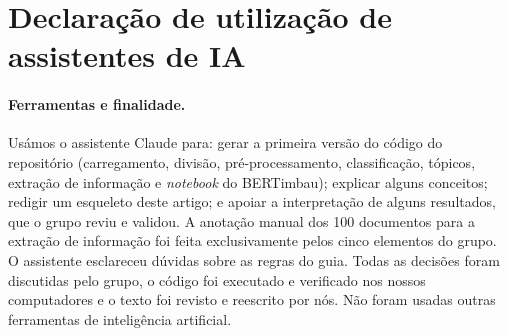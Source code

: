 \section{Declaração de utilização de assistentes de IA}\label{app:ia}

\paragraph{Ferramentas e finalidade.}
Usámos o assistente Claude para: gerar a primeira versão do código do repositório (carregamento,
divisão, pré-processamento, classificação, tópicos, extração de informação e \emph{notebook} do
BERTimbau); explicar alguns conceitos; redigir um esqueleto deste
artigo; e apoiar a interpretação de alguns resultados, que o grupo reviu e validou. A anotação manual dos 100
documentos para a extração de informação foi feita exclusivamente pelos cinco elementos do grupo. O
assistente esclareceu dúvidas sobre as regras do guia. Todas as decisões foram discutidas pelo
grupo, o código foi executado e verificado nos nossos computadores e o texto foi revisto e reescrito
por nós. Não foram usadas outras ferramentas de inteligência artificial.

